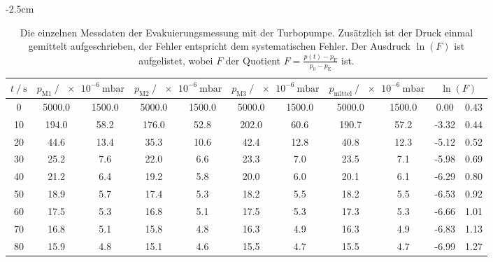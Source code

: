   \begin{table}[h]
    \centering
    \caption{Die einzelnen Messdaten der Evakuierungsmessung mit der Turbopumpe. 
    Zusätzlich ist der Druck einmal gemittelt aufgeschrieben, der Fehler entspricht dem systematischen Fehler. 
    Der Ausdruck $\ln(F)$ ist aufgelistet, wobei $F$ der Quotient $F = \frac{p(t) - p_\text{E}}{p_0 - p_\text{E}}$ ist. }
    \label{tab:turbo_eva}
    \begin{center}
      \addtolength{\leftskip} {-2.5cm} %
      \addtolength{\rightskip}{-2.5cm}
    \begin{tabular*}{1.2\textwidth}{@{\extracolsep{\fill}} S[table-format=3.0] S @{${}\pm{}$} S S @{${}\pm{}$} S  S @{${}\pm{}$} S S @{${}\pm{}$} S
                                                           S[table-format=2.2] @{${}\pm{}$} S[table-format=1.2]}
      \toprule
      {$t \mathbin{/} \si{\second}$} &  &  &  &  &  \\
       & 5000.0 & 1500.0 & 5000.0 & 1500.0 & 5000.0 & 1500.0 & 5000.0 & 1500.0 &   0.00 & 0.43 \\
       10 &  194.0 &   58.2 &  176.0 &   52.8 &  202.0 &   60.6 &  190.7 &   57.2 &  -3.32 & 0.44 \\
       20 &   44.6 &   13.4 &   35.3 &   10.6 &   42.4 &   12.8 &   40.8 &   12.3 &  -5.12 & 0.52 \\
       30 &   25.2 &    7.6 &   22.0 &    6.6 &   23.3 &    7.0 &   23.5 &    7.1 &  -5.98 & 0.69 \\
       40 &   21.2 &    6.4 &   19.2 &    5.8 &   20.0 &    6.0 &   20.1 &    6.1 &  -6.29 & 0.80 \\
       50 &   18.9 &    5.7 &   17.4 &    5.3 &   18.2 &    5.5 &   18.2 &    5.5 &  -6.53 & 0.92 \\
       60 &   17.5 &    5.3 &   16.8 &    5.1 &   17.5 &    5.3 &   17.3 &    5.3 &  -6.66 & 1.01 \\
       70 &   16.8 &    5.1 &   15.8 &    4.8 &   16.3 &    4.9 &   16.3 &    4.9 &  -6.83 & 1.13 \\
       80 &   15.9 &    4.8 &   15.1 &    4.6 &   15.5 &    4.7 &   15.5 &    4.7 &  -6.99 & 1.27 \\

\end{tabular*}
\end{center}
\end{table}
